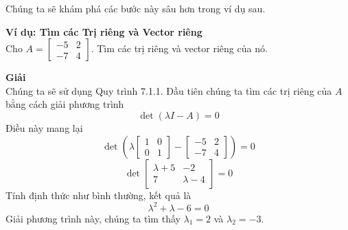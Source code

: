 Chúng ta sẽ khám phá các bước này sâu hơn trong ví dụ sau.

\textbf{Ví dụ: Tìm các Trị riêng và Vector riêng} \\
Cho $A=\begin{bmatrix}-5&2\\ -7&4\end{bmatrix}$. Tìm các trị riêng và vector riêng của nó.

\textbf{Giải} \\
Chúng ta sẽ sử dụng Quy trình 7.1.1. Đầu tiên chúng ta tìm các trị riêng của $A$ bằng cách giải phương trình
\begin{equation*}
\det(\lambda I-A)=0
\end{equation*}
Điều này mang lại
\begin{equation}
\det\left(\lambda\begin{bmatrix}1&0\\ 0&1\end{bmatrix}-\begin{bmatrix}-5&2\\ -7&4\end{bmatrix}\right)=0
\end{equation}
\begin{equation*}
\det\begin{bmatrix}\lambda+5&-2\\ 7&\lambda-4\end{bmatrix}=0
\end{equation*}
Tính định thức như bình thường, kết quả là
\begin{equation*}
\lambda^{2}+\lambda-6=0
\end{equation*}
Giải phương trình này, chúng ta tìm thấy $\lambda_{1}=2$ và $\lambda_{2}=-3$.

